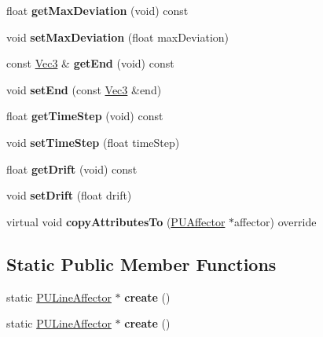 \begin{DoxyCompactItemize}
\item 
\mbox{\label{classPULineAffector_ad561a55b8e524f169c1674f24b0620cc}} 
float {\bfseries get\+Max\+Deviation} (void) const
\item 
\mbox{\label{classPULineAffector_aa6932c0c23fc4028c1028fc3f2ade169}} 
void {\bfseries set\+Max\+Deviation} (float max\+Deviation)
\item 
\mbox{\label{classPULineAffector_ae42a029a55af3c7e3fcc955c8ffbf75b}} 
const \hyperlink{classVec3}{Vec3} \& {\bfseries get\+End} (void) const
\item 
\mbox{\label{classPULineAffector_a0b9231d2fb7d3cf8cbeb13f29a4e0d1f}} 
void {\bfseries set\+End} (const \hyperlink{classVec3}{Vec3} \&end)
\item 
\mbox{\label{classPULineAffector_ab18f28512bc10cd79b909c48394772ad}} 
float {\bfseries get\+Time\+Step} (void) const
\item 
\mbox{\label{classPULineAffector_ae60038a786cdf8d1baf3d7062deeb292}} 
void {\bfseries set\+Time\+Step} (float time\+Step)
\item 
\mbox{\label{classPULineAffector_a43938e1f0151fbd10a18d8302efde8ae}} 
float {\bfseries get\+Drift} (void) const
\item 
\mbox{\label{classPULineAffector_acf83a6c5cd1cd821cf556e22ec457c8c}} 
void {\bfseries set\+Drift} (float drift)
\item 
\mbox{\label{classPULineAffector_a29eff28cb3a181e05a5305523e28f5dc}} 
virtual void {\bfseries copy\+Attributes\+To} (\hyperlink{classPUAffector}{P\+U\+Affector} $\ast$affector) override
\end{DoxyCompactItemize}
\subsection*{Static Public Member Functions}
\begin{DoxyCompactItemize}
\item 
\mbox{\label{classPULineAffector_a0acbeb892568dac0f21c54f2a182a85a}} 
static \hyperlink{classPULineAffector}{P\+U\+Line\+Affector} $\ast$ {\bfseries create} ()
\item 
\mbox{\label{classPULineAffector_a3562d60239835ff412d27f74d4a672bc}} 
static \hyperlink{classPULineAffector}{P\+U\+Line\+Affector} $\ast$ {\bfseries create} ()
\end{DoxyCompactItemize}
